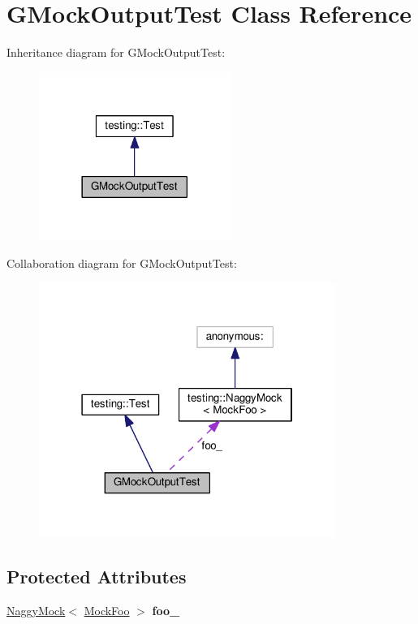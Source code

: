 \hypertarget{class_g_mock_output_test}{}\section{G\+Mock\+Output\+Test Class Reference}
\label{class_g_mock_output_test}


Inheritance diagram for G\+Mock\+Output\+Test\+:
\nopagebreak
\begin{figure}[H]
\begin{center}
\leavevmode
\includegraphics[width=177pt]{class_g_mock_output_test__inherit__graph}
\end{center}
\end{figure}


Collaboration diagram for G\+Mock\+Output\+Test\+:
\nopagebreak
\begin{figure}[H]
\begin{center}
\leavevmode
\includegraphics[width=274pt]{class_g_mock_output_test__coll__graph}
\end{center}
\end{figure}
\subsection*{Protected Attributes}
\begin{DoxyCompactItemize}
\item 
\mbox{\label{class_g_mock_output_test_aed97d2ca515d69466968c60575cc18a2}} 
\mbox{\hyperlink{classtesting_1_1_naggy_mock}{Naggy\+Mock}}$<$ \mbox{\hyperlink{class_mock_foo}{Mock\+Foo}} $>$ {\bfseries foo\+\_\+}
\end{DoxyCompactItemize}
